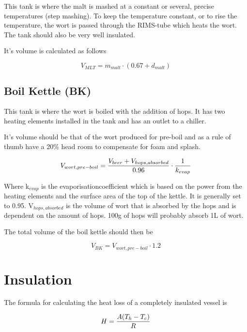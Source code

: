 \documentclass[11pt,fleqn,openany]{book} %
\begin{document}
This tank is where the malt is mashed at a constant or several, precise temperatures (step mashing). To keep the temperature constant, or to rise the temperature, the wort is passed through the RIMS-tube which heats the wort. The tank should also be very well insulated.

It's volume is calculated as follows

\begin{equation}
V_{MLT} = m_{malt} \cdot (0.67 + d_{malt})
\end{equation}

\subsection{Boil Kettle (BK)}

This tank is where the wort is boiled with the addition of hops. It has two heating elements installed in the tank and has an outlet to a chiller.

It's volume should be that of the wort produced for pre-boil and as a rule of thumb have a 20\% head room to compensate for foam and splash.

\begin{equation}
V_{wort, pre-boil} = {{V_{beer} + V_{hops, absorbed}} \over 0.96} \cdot {1 \over k_{evap}}
\end{equation}

Where k$_{evap}$ is the evaporisationcoefficient which is based on the power from the heating elements and the surface area of the top of the kettle. It is generally set to 0.95. V$_{hops, absorbed}$ is the volume of wort that is absorbed by the hops and is dependent on the amount of hops. 100g of hops will probably absorb 1L of wort.

The total volume of the boil kettle should then be

\begin{equation}
V_{BK} = V_{wort, pre-boil} \cdot 1.2
\end{equation}

\section{Insulation}

The formula for calculating the heat loss of a completely insulated vessel is

\begin{equation}
H = {{A (T_h - T_c)} \over R}
\end{equation}
\end{document}
